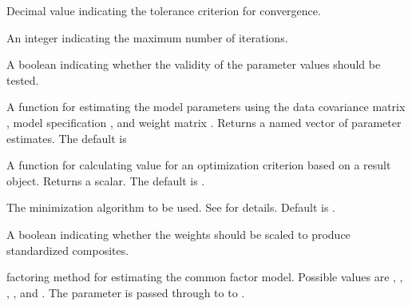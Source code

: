 \documentclass[a4paper]{book}
\begin{document}
\begin{Arguments}
\begin{ldescription}
\item[\code{tol}] Decimal value indicating the tolerance criterion for convergence.

\item[\code{iter}] An integer indicating the maximum number of iterations.

\item[\code{validateInput}] A boolean indicating whether the validity of the parameter values should be tested.

\item[\code{parameterEstim}] A function for estimating the model parameters using
the data covariance matrix , model specification , 
and weight matrix . Returns a named vector of parameter estimates.
The default is 

\item[\code{optimCrit}] A function for calculating value for an optimization criterion based on a
 result object. Returns a scalar. The default is .

\item[\code{method}] The minimization algorithm to be used. See 
for details. Default is .

\item[\code{standardize}] A boolean indicating whether  the weights should be scaled to produce
standardized composites.

\item[\code{fm}] factoring method for estimating the common factor model. Possible values are
, , , , and . The parameter is passed through to
to .
\end{ldescription}
\end{Arguments}
%
\end{document}
